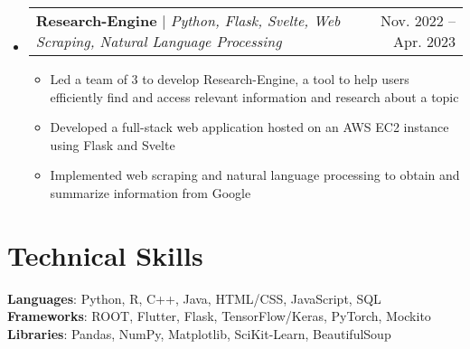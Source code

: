 \documentclass[letterpaper,11pt]{article}
\makeatletter
\newcommand{\resumeItem}[1]{
  \item\small{
    {#1 \vspace{-2pt}}
  }
}
\newcommand{\resumeProjectHeading}[2]{
    \item
    \begin{tabular*}{0.97\textwidth}{l@{\extracolsep{\fill}}r}
      \small#1 & #2 \\
    \end{tabular*}\vspace{-7pt}
}
\newcommand{\resumeSubHeadingListStart}{\begin{itemize}[leftmargin=0.15in, label={}]}
\newcommand{\resumeSubHeadingListEnd}{\end{itemize}}
\newcommand{\resumeItemListStart}{\begin{itemize}}
\newcommand{\resumeItemListEnd}{\end{itemize}\vspace{-5pt}}
\makeatother
\begin{document}
  \resumeSubHeadingListStart
    \resumeProjectHeading
      {\textbf{Research-Engine} $|$ \emph{Python, Flask, Svelte, Web Scraping, Natural Language Processing}}{Nov. 2022 -- Apr. 2023}
      \resumeItemListStart
        \resumeItem{Led a team of 3 to develop Research-Engine, a tool to help users efficiently find and access relevant information and research about a topic}
        \resumeItem{Developed a full-stack web application hosted on an AWS EC2 instance using Flask and Svelte}
        \resumeItem{Implemented web scraping and natural language processing to obtain and summarize information from Google}
      \resumeItemListEnd
  \resumeSubHeadingListEnd

\section{Technical Skills}
   \begin{itemize}[leftmargin=0.15in, label={}] 
    \small{\item{
      \textbf{Languages}: Python, R, C++, Java, HTML/CSS, JavaScript, SQL\\
      \textbf{Frameworks}: ROOT, Flutter, Flask, TensorFlow/Keras, PyTorch, Mockito\\
      \textbf{Libraries}: Pandas, NumPy, Matplotlib, SciKit-Learn, BeautifulSoup
       }}
\end{itemize}
\end{document}
